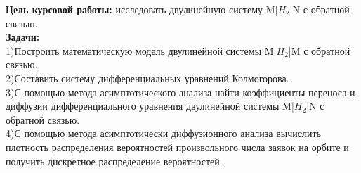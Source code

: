 \textbf{Цель курсовой работы:} исследовать двулинейную систему M|$H_{2}$|N с обратной связью.\\

\textbf{Задачи:}\\
1)Построить математическую модель двулинейной системы M|$H_{2}$|M с обратной связью.\\
2)Составить систему дифференциальных уравнений Колмогорова.\\
3)С помощью метода асимптотического анализа найти коэффициенты переноса и диффузии дифференциального уравнения двулинейной системы M|$H_{2}$|N с обратной связью.\\
4)С помощью метода асимптотически диффузионного анализа вычислить плотность распределения вероятностей произвольного числа заявок на орбите и получить дискретное распределение вероятностей.

\newpage